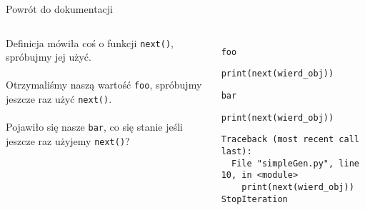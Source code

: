 \documentclass[aspectratio=169]{beamer}
\begin{document}
\begin{frame}[fragile]{Powrót do dokumentacji}
  \begin{columns}
    \begin{column}{0.5 \textwidth}
      Definicja mówiła coś o funkcji \texttt{next()}, spróbujmy jej
      użyć.\\~\\

      Otrzymaliśmy naszą wartość \texttt{foo}, spróbujmy jeszcze raz użyć 
      \texttt{next()}.\\~\\

      Pojawiło się nasze \texttt{bar}, co się stanie jeśli jeszcze raz użyjemy 
      \texttt{next()}?

    \end{column}
    \begin{column}{0.5\textwidth}
      \scriptsize
      \inputminted[linenos]{python}{./examples/simpleGen.py}

      \texttt{foo}

      \begin{verbatim}
print(next(wierd_obj))
      \end{verbatim}
      \texttt{bar}

      \begin{verbatim}
print(next(wierd_obj))
      \end{verbatim}
      \begin{verbatim}
Traceback (most recent call last):
  File "simpleGen.py", line 10, in <module>
    print(next(wierd_obj))
StopIteration
      \end{verbatim}
    \end{column}
  \end{columns}
\end{frame}
\end{document}
